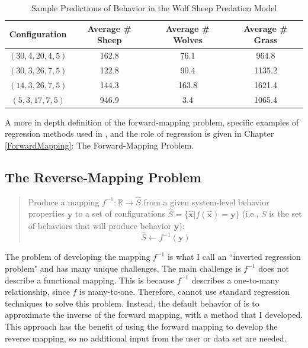 \begin{table}[ht]
  \caption{Sample Predictions of Behavior in the Wolf Sheep Predation Model}
  \centering
  \begin{tabular}{c c c c}
    \hline \hline
    Configuration & Average \# Sheep & Average \# Wolves & Average \# Grass \\
    \hline
    $(30, 4, 20, 4, 5)$ & 162.8 & 76.1 & 964.8 \\
    $(30, 3, 26, 7, 5)$ & 122.8 & 90.4 & 1135.2 \\
    $(14, 3, 26, 7, 5)$ & 144.3 & 163.8 & 1621.4 \\
    $(5, 3, 17, 7, 5)$ & 946.9 & 3.4 & 1065.4 \\
    \hline
  \end{tabular}
  \label{table:ws_predictions}
\end{table}


A more in depth definition of the forward-mapping problem, specific examples of regression methods used in \fw, and the role of regression is given in Chapter \ref{ForwardMapping}: The Forward-Mapping Problem.


\subsection{The Reverse-Mapping Problem}


\begin{quote}
Produce a mapping $ f^{-1}: \mathbb{R} \rightarrow \hat S$ from a given system-level behavior properties $\mathbf y$ to a set of
configurations $ \hat S = \{ \mathbf {\hat x} | f( \mathbf {\hat x}) = \mathbf y \}$
(i.e., $S$ is the set of behaviors that will produce behavior $\mathbf y$):
\[\hat S \leftarrow f^{-1}(\mathbf y) \]
\end{quote}

The problem of developing the mapping $f^{-1}$ is what I call an ``inverted regression problem" and has many unique challenges.
The main challenge is $f^{-1}$ does not describe a functional mapping.
This is because $f^{-1}$ describes a one-to-many relationship, since $f$ is many-to-one.
Therefore, \fw cannot use standard regression techniques to solve this problem.
Instead, the default behavior of \fw is to approximate the inverse of the forward mapping, with a method that I developed.
This approach has the benefit of using the forward mapping to develop the reverse mapping, so no additional input from the user or data set are needed.

